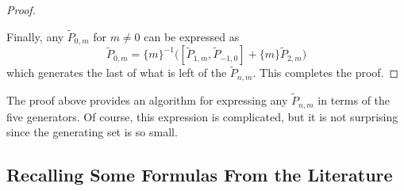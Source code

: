 \begin{proof}
\begin{center}
\end{center}

Finally, any $\tilde{P}_{0,m}$ for $m \neq 0$ can be expressed as
\[
    \tilde{P}_{0,m} = \{ m \}^{-1} \Big( [\tilde{P}_{1,m}, \tilde{P}_{-1,0}] + \{ m \} \tilde{P}_{2,m} \Big)
\]
which generates the last of what is left of the $\tilde{P}_{n,m}$. This completes the proof.
\end{proof}

\begin{remark}
The proof above provides an algorithm for expressing any $\tilde{P}_{n,m}$ in terms of the five generators. Of course, this expression is complicated, but it is not surprising since the generating set is so small.
\end{remark}






\subsection{Recalling Some Formulas From the Literature}

